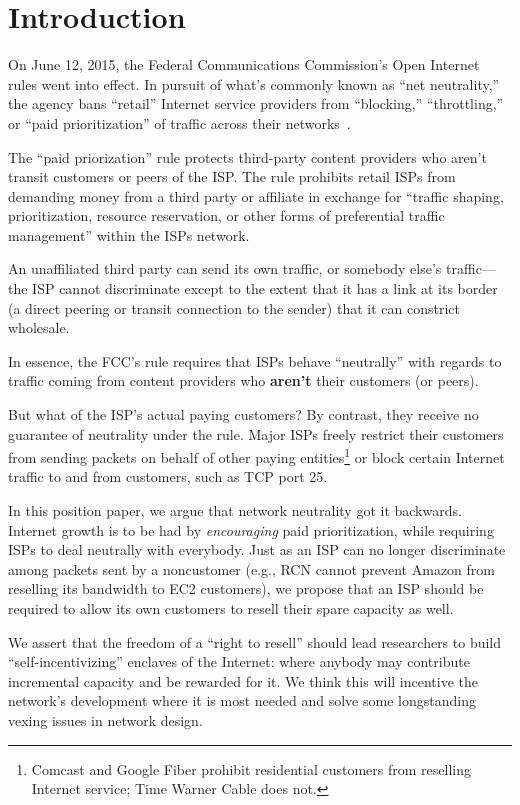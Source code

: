 \section{Introduction}

\label{sec:intro}

On June 12, 2015, the Federal Communications Commission's Open
Internet rules went into effect. In pursuit of what's commonly known
as ``net neutrality,'' the agency bans ``retail'' Internet service
providers from ``blocking,'' ``throttling,'' or ``paid
prioritization'' of traffic across their networks~\cite{openinternet}.

The ``paid priorization'' rule protects third-party
content providers who aren't transit customers or peers of the
ISP. The rule prohibits retail ISPs from demanding money from a third
party or affiliate in exchange for ``traffic shaping, prioritization,
resource reservation, or other forms of preferential traffic
management'' within the ISPs network.

An unaffiliated third party can send its own traffic, or somebody
else's traffic---the ISP cannot discriminate except to the extent that
it has a link at its border (a direct peering or transit connection to
the sender) that it can constrict wholesale.

In essence, the FCC's rule requires that ISPs behave ``neutrally''
with regards to traffic coming from content providers who
\textbf{aren't} their customers (or peers).

But what of the ISP's actual paying customers? By contrast, they
receive no guarantee of neutrality under the rule. Major ISPs freely
restrict their customers from sending packets on behalf of other
paying entities\footnote{Comcast and Google Fiber prohibit residential
  customers from reselling Internet service; Time Warner Cable does
  not.} or block certain Internet traffic to and from
customers, such as TCP port 25.

In this position paper, we argue that network neutrality got it
backwards. Internet growth is to be had by \emph{encouraging} paid
prioritization, while requiring ISPs to deal neutrally with
everybody. Just as an ISP can no longer discriminate among packets
sent by a noncustomer (e.g., RCN cannot prevent Amazon from reselling
its bandwidth to EC2 customers), we propose that an ISP should be
required to allow its own customers to resell their spare capacity as
well.

We assert that the freedom of a ``right to resell'' should lead
researchers to build ``self-incentivizing'' enclaves of the Internet:
where anybody may contribute incremental capacity and be rewarded for
it. We think this will incentive the network's development where it is
most needed and solve some longstanding vexing issues in network
design.

